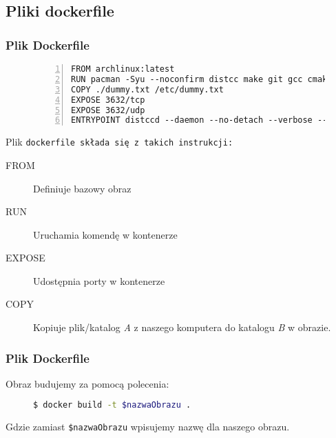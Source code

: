 \documentclass[aspectratio=169]{beamer}
\begin{document}
\subsection{Pliki dockerfile}
\begin{frame}[fragile]
    \frametitle{Plik Dockerfile}

    \begin{figure}
        \begin{lstlisting}[frame=L,basicstyle=\tiny\ttfamily,numbers=left,
        morekeywords={FROM,RUN,EXPOSE,ENTRYPOINT}]
FROM archlinux:latest
RUN pacman -Syu --noconfirm distcc make git gcc cmake
COPY ./dummy.txt /etc/dummy.txt
EXPOSE 3632/tcp
EXPOSE 3632/udp
ENTRYPOINT distccd --daemon --no-detach --verbose --allow-private
    \end{lstlisting}
    \end{figure}
    Plik \texttt{dockerfile składa się z takich instrukcji:}
    \pause
    \begin{description}
        \item[FROM] Definiuje bazowy obraz
    \pause
        \item[RUN] Uruchamia komendę w kontenerze
    \pause
        \item[EXPOSE] Udostępnia porty w kontenerze
    \pause
        \item[COPY] Kopiuje plik/katalog \emph{A} z naszego komputera do katalogu \emph{B} w obrazie.
    \end{description}
\end{frame}
\begin{frame}[fragile]
    \frametitle{Plik Dockerfile}
    Obraz budujemy za pomocą polecenia:

    \begin{figure}[H]
        \begin{lstlisting}[frame=single,basicstyle=\footnotesize\ttfamily,language=bash,morekeywords={docker}]
$ docker build -t $nazwaObrazu .
    \end{lstlisting}
    \end{figure}

    Gdzie zamiast \texttt{\$nazwaObrazu} wpisujemy nazwę dla naszego obrazu.
\end{frame}
\end{document}
